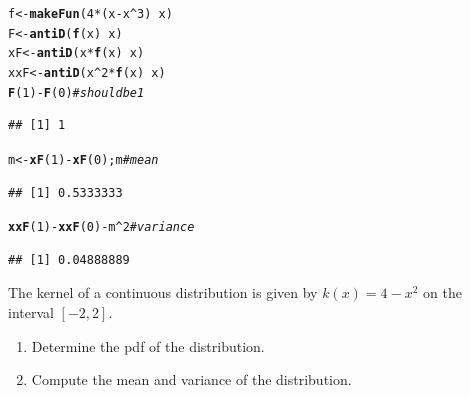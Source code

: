 \documentclass[twoside]{book}\usepackage[]{graphicx}\usepackage[]{xcolor}
\makeatletter
\newcommand{\hlnum}[1]{\textcolor[rgb]{0.686,0.059,0.569}{#1}}%
\newcommand{\hlcom}[1]{\textcolor[rgb]{0.678,0.584,0.686}{\textit{#1}}}%
\newcommand{\hlopt}[1]{\textcolor[rgb]{0,0,0}{#1}}%
\newcommand{\hlstd}[1]{\textcolor[rgb]{0.345,0.345,0.345}{#1}}%
\newcommand{\hlkwb}[1]{\textcolor[rgb]{0.69,0.353,0.396}{#1}}%
\newcommand{\hlkwd}[1]{\textcolor[rgb]{0.737,0.353,0.396}{\textbf{#1}}}%
\newenvironment{kframe}{%
 \def\at@end@of@kframe{}%
 \ifinner\ifhmode%
  \def\at@end@of@kframe{\end{minipage}}%
  \begin{minipage}{\columnwidth}%
 \fi\fi%
 \def\FrameCommand##1{\hskip\@totalleftmargin \hskip-\fboxsep
 \colorbox{shadecolor}{##1}\hskip-\fboxsep
     \hskip-\linewidth \hskip-\@totalleftmargin \hskip\columnwidth}%
 \MakeFramed {\advance\hsize-\width
   \@totalleftmargin\z@ \linewidth\hsize
   \@setminipage}}%
 {\par\unskip\endMakeFramed%
 \at@end@of@kframe}
\newenvironment{knitrout}{}{} %
\makeatother
\begin{document}
\begin{solution}
\begin{knitrout}
\color{fgcolor}\begin{kframe}
\begin{alltt}
  \hlstd{f} \hlkwb{<-} \hlkwd{makeFun}\hlstd{(} \hlnum{4}\hlopt{*}\hlstd{(x}\hlopt{-}\hlstd{x}\hlopt{^}\hlnum{3}\hlstd{)} \hlopt{~} \hlstd{x )}
  \hlstd{F} \hlkwb{<-} \hlkwd{antiD}\hlstd{(} \hlkwd{f}\hlstd{(x)} \hlopt{~} \hlstd{x )}
 \hlstd{xF} \hlkwb{<-} \hlkwd{antiD}\hlstd{( x} \hlopt{*} \hlkwd{f}\hlstd{(x)} \hlopt{~} \hlstd{x )}
\hlstd{xxF} \hlkwb{<-} \hlkwd{antiD}\hlstd{( x}\hlopt{^}\hlnum{2} \hlopt{*} \hlkwd{f}\hlstd{(x)} \hlopt{~} \hlstd{x )}
\hlkwd{F}\hlstd{(}\hlnum{1}\hlstd{)} \hlopt{-} \hlkwd{F}\hlstd{(}\hlnum{0}\hlstd{)}                   \hlcom{# should be 1}
\end{alltt}
\begin{verbatim}
## [1] 1
\end{verbatim}
\begin{alltt}
\hlstd{m} \hlkwb{<-} \hlkwd{xF}\hlstd{(}\hlnum{1}\hlstd{)} \hlopt{-} \hlkwd{xF}\hlstd{(}\hlnum{0}\hlstd{); m}         \hlcom{# mean}
\end{alltt}
\begin{verbatim}
## [1] 0.5333333
\end{verbatim}
\begin{alltt}
\hlkwd{xxF}\hlstd{(}\hlnum{1}\hlstd{)} \hlopt{-} \hlkwd{xxF}\hlstd{(}\hlnum{0}\hlstd{)} \hlopt{-} \hlstd{m}\hlopt{^}\hlnum{2}         \hlcom{# variance}
\end{alltt}
\begin{verbatim}
## [1] 0.04888889
\end{verbatim}
\end{kframe}
\end{knitrout}
\end{solution}
	

\begin{problem}
The kernel of a continuous distribution is given by $k(x) = 4-x^2$
on the interval $[-2,2]$.  
\begin{enumerate}
	\item
		Determine the pdf of the distribution.
	\item
		Compute the mean and variance of the distribution.
\end{enumerate}
\end{problem}
\end{document}
